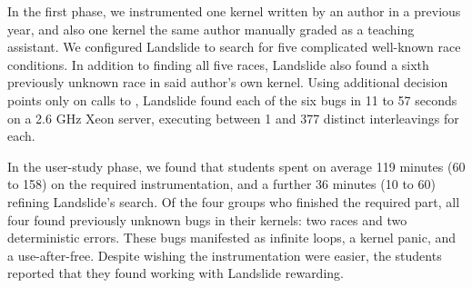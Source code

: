 In the first phase, we instrumented one kernel written by an author in a previous year, and also one kernel the same author manually graded as a teaching assistant.
We configured Landslide to search for five complicated well-known race conditions.
In addition to finding all five races, Landslide also found a sixth previously unknown race in said author's own kernel.
Using additional decision points only on calls to , Landslide found each of the six bugs in 11 to 57 seconds on a 2.6 GHz Xeon server, executing between 1 and 377 distinct interleavings for each.

In the user-study phase, we found that students spent on average 119 minutes (60 to 158) on the required instrumentation, and a further 36 minutes (10 to 60) refining Landslide's search.
Of the four groups who finished the required part, all four found previously unknown bugs in their kernels: two races and two deterministic errors.
These bugs manifested as infinite loops, a kernel panic, and a use-after-free.
Despite wishing the instrumentation were easier, the students reported that they found working with Landslide rewarding.
